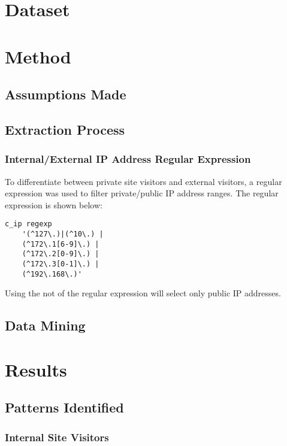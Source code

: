 \documentclass[12pt,titlepage]{article}
\begin{document}
\section{Dataset}

\section{Method}

\subsection{Assumptions Made}

\subsection{Extraction Process}

\subsubsection{Internal/External IP Address Regular Expression}

To differentiate between private site visitors and external visitors, a regular expression was used to filter private/public IP address ranges. The regular expression is shown below:

\begin{lstlisting}
c_ip regexp 
	'(^127\.)|(^10\.) | 
	(^172\.1[6-9]\.) |
	(^172\.2[0-9]\.) |
	(^172\.3[0-1]\.) |
	(^192\.168\.)'
\end{lstlisting}

Using the not of the regular expression will select only public IP addresses.

\subsection{Data Mining}

\section{Results}
\label{sec:results}

\subsection{Patterns Identified}

\subsubsection{Internal Site Visitors}
\end{document}
